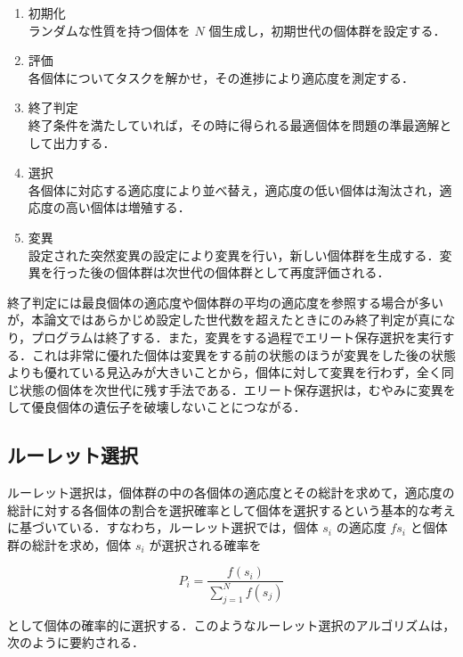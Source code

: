 \begin{enumerate}
    \item 初期化 \\
    ランダムな性質を持つ個体を $ N $ 個生成し，初期世代の個体群を設定する．

    \item 評価 \\
    各個体についてタスクを解かせ，その進捗により適応度を測定する．

    \item 終了判定 \\
    終了条件を満たしていれば，その時に得られる最適個体を問題の準最適解として出力する．

    \item 選択 \\
    各個体に対応する適応度により並べ替え，適応度の低い個体は淘汰され，適応度の高い個体は増殖する．

    \item 変異 \\
    設定された突然変異の設定により変異を行い，新しい個体群を生成する．変異を行った後の個体群は次世代の個体群として再度評価される．
\end{enumerate}

終了判定には最良個体の適応度や個体群の平均の適応度を参照する場合が多いが，本論文ではあらかじめ設定した世代数を超えたときにのみ終了判定が真になり，プログラムは終了する．また，変異をする過程でエリート保存選択を実行する．これは非常に優れた個体は変異をする前の状態のほうが変異をした後の状態よりも優れている見込みが大きいことから，個体に対して変異を行わず，全く同じ状態の個体を次世代に残す手法である．エリート保存選択は，むやみに変異をして優良個体の遺伝子を破壊しないことにつながる．

\subsection{ルーレット選択}
ルーレット選択は，個体群の中の各個体の適応度とその総計を求めて，適応度の総計に対する各個体の割合を選択確率として個体を選択するという基本的な考えに基づいている\cite{遺伝的アルゴリズム}．すなわち，ルーレット選択では，個体 $ s_i $ の適応度 $ f{s_i} $ と個体群の総計を求め，個体 $ s_i $ が選択される確率を

\begin{equation}
    P_i = \frac{f(s_i)}{\sum^N_{j=1} f(s_j)}
\end{equation}

として個体の確率的に選択する．このようなルーレット選択のアルゴリズムは，次のように要約される．

